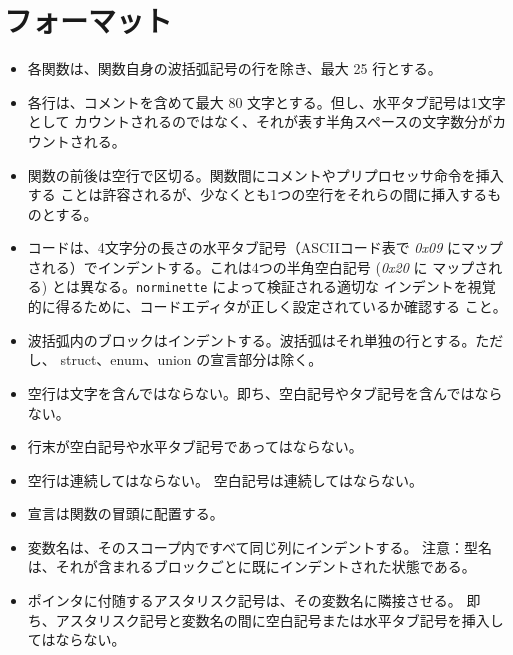 \documentclass{42-ja}
\begin{document}
    \section{フォーマット}

            \begin{itemize}

            \item 各関数は、関数自身の波括弧記号の行を除き、最大 25 行とする。

            \item 各行は、コメントを含めて最大 80 文字とする。但し、水平タブ記号は1文字として
              カウントされるのではなく、それが表す半角スペースの文字数分がカウントされる。

            \item 関数の前後は空行で区切る。関数間にコメントやプリプロセッサ命令を挿入する
              ことは許容されるが、少なくとも1つの空行をそれらの間に挿入するものとする。

            \item コードは、4文字分の長さの水平タブ記号（ASCIIコード表で \textit{0x09} 
              にマップされる）でインデントする。これは4つの半角空白記号 (\textit{0x20} に
              マップされる) とは異なる。\texttt{norminette} によって検証される適切な
              インデントを視覚的に得るために、コードエディタが正しく設定されているか確認する
              こと。

            \item 波括弧内のブロックはインデントする。波括弧はそれ単独の行とする。ただし、
              struct、enum、union の宣言部分は除く。

            \item 空行は文字を含んではならない。即ち、空白記号やタブ記号を含んではならない。

            \item 行末が空白記号や水平タブ記号であってはならない。

            \item 空行は連続してはならない。
              空白記号は連続してはならない。

            \item 宣言は関数の冒頭に配置する。

            \item 変数名は、そのスコープ内ですべて同じ列にインデントする。
              注意：型名は、それが含まれるブロックごとに既にインデントされた状態である。

            \item ポインタに付随するアスタリスク記号は、その変数名に隣接させる。
              即ち、アスタリスク記号と変数名の間に空白記号または水平タブ記号を挿入してはならない。


\end{itemize}
\end{document}

